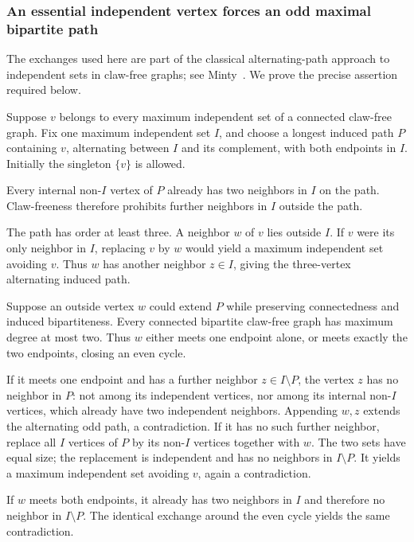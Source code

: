 \documentclass[11pt,a4paper]{article}
\theoremstyle{definition}\newtheorem{definition}[theorem]{Definition}
\theoremstyle{remark}\newtheorem{remark}[theorem]{Remark}
\begin{document}
\subsubsection{An essential independent vertex forces an odd maximal
bipartite
path}\label{late:claw:an-essential-independent-vertex-forces-an-odd-maximal-bipartite-path}

The exchanges used here are part of the classical alternating-path approach
to independent sets in claw-free graphs; see Minty~\cite{late:Minty}.
We prove the precise assertion required below.


Suppose \(v\) belongs to every maximum independent set of a connected
claw-free graph. Fix one maximum independent set \(I\), and choose a
longest induced path \(P\) containing \(v\), alternating between \(I\)
and its complement, with both endpoints in \(I\). Initially the
singleton \(\{v\}\) is allowed.

Every internal non-\(I\) vertex of \(P\) already has two neighbors in
\(I\) on the path. Claw-freeness therefore prohibits further neighbors
in \(I\) outside the path.

The path has order at least three. A neighbor \(w\) of \(v\) lies
outside \(I\). If \(v\) were its only neighbor in \(I\), replacing \(v\)
by \(w\) would yield a maximum independent set avoiding \(v\). Thus
\(w\) has another neighbor \(z\in I\), giving the three-vertex
alternating induced path.

Suppose an outside vertex \(w\) could extend \(P\) while preserving
connectedness and induced bipartiteness. Every connected bipartite
claw-free graph has maximum degree at most two. Thus \(w\) either meets
one endpoint alone, or meets exactly the two endpoints, closing an even
cycle.

If it meets one endpoint and has a further neighbor
\(z\in I\setminus P\), the vertex \(z\) has no neighbor in \(P\): not
among its independent vertices, nor among its internal non-\(I\)
vertices, which already have two independent neighbors. Appending
\(w,z\) extends the alternating odd path, a contradiction. If it has no
such further neighbor, replace all \(I\) vertices of \(P\) by its
non-\(I\) vertices together with \(w\). The two sets have equal size;
the replacement is independent and has no neighbors in \(I\setminus P\).
It yields a maximum independent set avoiding \(v\), again a
contradiction.

If \(w\) meets both endpoints, it already has two neighbors in \(I\) and
therefore no neighbor in \(I\setminus P\). The identical exchange around
the even cycle yields the same contradiction.
\end{document}
